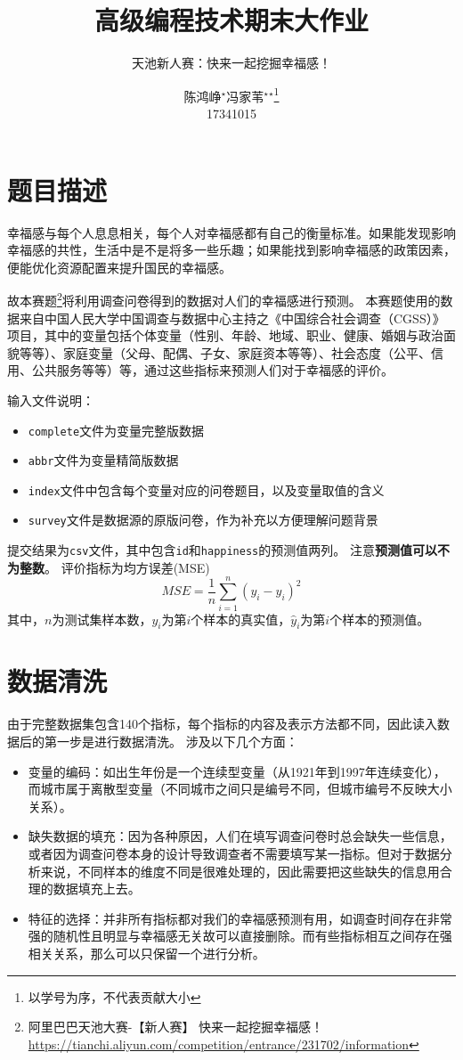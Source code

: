 \documentclass[logo,reportComp]{thesis}
\title{高级编程技术期末大作业}
\subtitle{天池新人赛：快来一起挖掘幸福感！}
\author{
陈鸿峥$^\star$\qquad\quad 冯家苇$^\star$\qquad\quad \makebox[3em][s]{符\hspace{\fill}尧}$^\star$\qquad\quad \makebox[3em][s]{傅\hspace{\fill}畅}\protect\footnote{以学号为序，不代表贡献大小}\qquad\quad\\17341015\qquad 17341035\qquad 17341037\qquad 17341038}
\begin{document}
\maketitle

\section{题目描述}
幸福感与每个人息息相关，每个人对幸福感都有自己的衡量标准。如果能发现影响幸福感的共性，生活中是不是将多一些乐趣；如果能找到影响幸福感的政策因素，便能优化资源配置来提升国民的幸福感。

故本赛题\footnote{阿里巴巴天池大赛-【新人赛】 快来一起挖掘幸福感！\url{https://tianchi.aliyun.com/competition/entrance/231702/information}}将利用调查问卷得到的数据对人们的幸福感进行预测。
本赛题使用的数据来自中国人民大学中国调查与数据中心主持之《中国综合社会调查（CGSS）》项目，其中的变量包括个体变量（性别、年龄、地域、职业、健康、婚姻与政治面貌等等）、家庭变量（父母、配偶、子女、家庭资本等等）、社会态度（公平、信用、公共服务等等）等，通过这些指标来预测人们对于幸福感的评价。

输入文件说明：
\begin{itemize}
	\item \verb'complete'文件为变量完整版数据
	\item \verb'abbr'文件为变量精简版数据
	\item \verb'index'文件中包含每个变量对应的问卷题目，以及变量取值的含义
	\item \verb'survey'文件是数据源的原版问卷，作为补充以方便理解问题背景
\end{itemize}

提交结果为\verb'csv'文件，其中包含\verb'id'和\verb'happiness'的预测值两列。
注意\textbf{预测值可以不为整数}。
评价指标为均方误差(MSE)
\[MSE=\frac{1}{n}\sum_{i=1}^n(y_i-\hat{y}_i)^2\]
其中，$n$为测试集样本数，$y_i$为第$i$个样本的真实值，$\hat{y}_i$为第$i$个样本的预测值。

\section{数据清洗}
由于完整数据集包含140个指标，每个指标的内容及表示方法都不同，因此读入数据后的第一步是进行数据清洗。
涉及以下几个方面：
\begin{itemize}
	\item 变量的编码：如出生年份是一个连续型变量（从1921年到1997年连续变化），而城市属于离散型变量（不同城市之间只是编号不同，但城市编号不反映大小关系）。
	\item 缺失数据的填充：因为各种原因，人们在填写调查问卷时总会缺失一些信息，或者因为调查问卷本身的设计导致调查者不需要填写某一指标。但对于数据分析来说，不同样本的维度不同是很难处理的，因此需要把这些缺失的信息用合理的数据填充上去。
	\item 特征的选择：并非所有指标都对我们的幸福感预测有用，如调查时间存在非常强的随机性且明显与幸福感无关故可以直接删除。而有些指标相互之间存在强相关关系，那么可以只保留一个进行分析。
\end{itemize}
\end{document}
